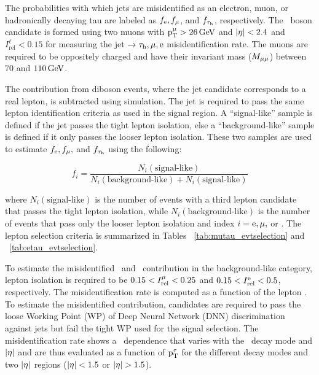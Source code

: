 The probabilities with which jets are misidentified as an electron, muon, or hadronically decaying tau are labeled as $f_{\text{e}}, f_{\mu}$, and $f_{\tau_{\text{h}}}$, respectively. The \PZ\, boson candidate is formed using two muons with $\text{p}_\text{T}^{\mu} > 26\,\text{Ge\hspace{-.08em}V}$ and $\lvert\eta\rvert < 2.4$ and $I^\ell_{\text{rel}} < 0.15$ for measuring the jet $\to\tau_{\text{h}}, \mu, \text{e}$ misidentification rate. The muons are required to be oppositely charged and have their invariant mass ($M_{\mu\mu}$) between 70 and $110\,\text{Ge\hspace{-.08em}V}$.

The contribution from diboson events, where the jet candidate corresponds to a real lepton, is subtracted using simulation. The jet is required to pass the same lepton identification criteria as used in the signal region. A ``signal-like'' sample is defined if the jet passes the tight lepton isolation, else a ``background-like'' sample is defined if it only passes the looser lepton isolation. These two samples are used to estimate $f_{\text{e}}, f_{\mu},$ and $f_{\tau_{\text{h}}}$ using the following:
\begin{linenomath*}
  \begin{equation*}
    f_{i} = \frac{N_i(\text{signal-like})}{N_{i}(\text{background-like}) + N_i(\text{signal-like})}
  \end{equation*}
\end{linenomath*}
where $N_i(\text{signal-like})$ is the number of events with a third lepton candidate that passes the tight lepton isolation, while $N_i(\text{background-like})$ is the number of events that pass only the looser lepton isolation and index $i = \text{e}, \mu,$ or \Pgt. The lepton selection criteria is summarized in Tables ~\ref{tab:mutau_evtselection} and ~\ref{tab:etau_evtselection}.

To estimate the misidentified \Pgm\, and \Pe\, contribution in the background-like category, lepton isolation is required to be $0.15 < I^{\mu}_{\text{rel}} < 0.25$ and $0.15 < I^{\text{e}}_{\text{rel}} < 0.5$, respectively. The misidentification rate is computed as a function of the lepton \pt. To estimate the \tauh misidentified contribution, \tauh candidates are required to pass the loose Working Point (WP) of Deep Neural Network (DNN) discrimination against jets but fail the tight WP used for the signal selection. The \tauh misidentification rate shows a \pt\, dependence that varies with the \Pgt\, decay mode and $\lvert\eta\rvert$ and are thus evaluated as a function of $\text{p}_\text{T}^{\tau}$ for the different decay modes and two $\lvert\eta\rvert$ regions ($\lvert\eta\rvert < 1.5$ or $\lvert\eta\rvert > 1.5$).

